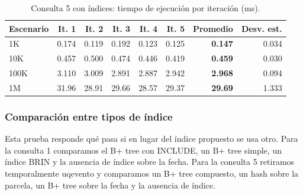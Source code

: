 \documentclass[11pt,letterpaper]{article}
\newcommand{\tbus}{\textunderscore\allowbreak}
\newcommand{\tb}[1]{{\ttfamily\let\_\tbus #1}}
\begin{document}
\begin{table}[H]
\centering\small
\begin{tabular}{lrrrrrrr}
\toprule
Escenario & It. 1 & It. 2 & It. 3 & It. 4 & It. 5 & Promedio & Desv. est. \\
\midrule
1K & 0.174 & 0.119 & 0.192 & 0.123 & 0.125 & \textbf{0.147} & 0.034 \\
10K & 0.457 & 0.500 & 0.474 & 0.446 & 0.419 & \textbf{0.459} & 0.030 \\
100K & 3.110 & 3.009 & 2.891 & 2.887 & 2.942 & \textbf{2.968} & 0.094 \\
1M & 31.96 & 28.91 & 29.66 & 28.57 & 29.37 & \textbf{29.69} & 1.333 \\
\bottomrule
\end{tabular}
\caption{Consulta 5 con índices: tiempo de ejecución por iteración (ms).}\label{tab:con5}
\end{table}


\subsubsection{Comparación entre tipos de índice}

Esta prueba responde qué pasa si en lugar del índice propuesto se usa otro. Para la consulta 1 comparamos el B+ tree con \tb{INCLUDE}, un B+ tree simple, un índice BRIN y la ausencia de índice sobre la fecha. Para la consulta 5 retiramos temporalmente \tb{uq\_evento} y comparamos un B+ tree compuesto, un hash sobre la parcela, un B+ tree sobre la fecha y la ausencia de índice.

\begin{table}[H]
\centering\small
{}
\caption{Comparación entre tipos de índice con un millón de registros. La mejora se calcula contra la variante sin índice.}\label{tab:tipos}
\end{table}
\end{document}
